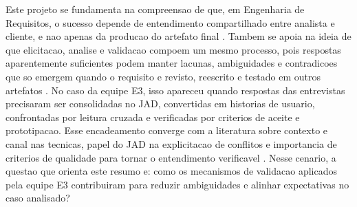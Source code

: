 ﻿\documentclass[12pt]{article}
\begin{document}
%
%
%
%
Este projeto se fundamenta na compreensao de que, em Engenharia de Requisitos, o sucesso depende de entendimento compartilhado entre analista e cliente, e nao apenas da producao do artefato final \cite{hofmann2001re}. Tambem se apoia na ideia de que elicitacao, analise e validacao compoem um mesmo processo, pois respostas aparentemente suficientes podem manter lacunas, ambiguidades e contradicoes que so emergem quando o requisito e revisto, reescrito e testado em outros artefatos \cite{hickey2004unified,nuseibeh2000roadmap}. No caso da equipe E3, isso apareceu quando respostas das entrevistas precisaram ser consolidadas no JAD, convertidas em historias de usuario, confrontadas por leitura cruzada e verificadas por criterios de aceite e prototipacao. Esse encadeamento converge com a literatura sobre contexto e canal nas tecnicas, papel do JAD na explicitacao de conflitos e importancia de criterios de qualidade para tornar o entendimento verificavel \cite{carrizo2017context,davidson1999jad,sakthivel1991verification,lucassen2016qus}. Nesse cenario, a questao que orienta este resumo e: como os mecanismos de validacao aplicados pela equipe E3 contribuiram para reduzir ambiguidades e alinhar expectativas no caso analisado?
\end{document}
